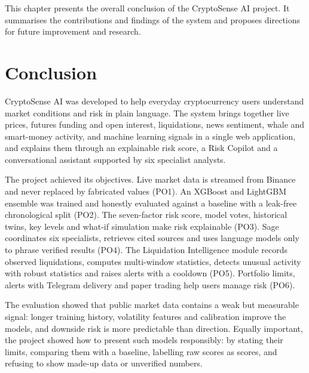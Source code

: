 
\chapteroverview
This chapter presents the overall conclusion of the CryptoSense AI project. It summarises the contributions and findings of the system and proposes directions for future improvement and research.

\section{Conclusion}
CryptoSense AI was developed to help everyday cryptocurrency users understand market conditions and risk in plain language. The system brings together live prices, futures funding and open interest, liquidations, news sentiment, whale and smart-money activity, and machine learning signals in a single web application, and explains them through an explainable risk score, a Risk Copilot and a conversational assistant supported by six specialist analysts.

The project achieved its objectives. Live market data is streamed from Binance and never replaced by fabricated values (PO1). An XGBoost and LightGBM ensemble was trained and honestly evaluated against a baseline with a leak-free chronological split (PO2). The seven-factor risk score, model votes, historical twins, key levels and what-if simulation make risk explainable (PO3). Sage coordinates six specialists, retrieves cited sources and uses language models only to phrase verified results (PO4). The Liquidation Intelligence module records observed liquidations, computes multi-window statistics, detects unusual activity with robust statistics and raises alerts with a cooldown (PO5). Portfolio limits, alerts with Telegram delivery and paper trading help users manage risk (PO6).

The evaluation showed that public market data contains a weak but measurable signal: longer training history, volatility features and calibration improve the models, and downside risk is more predictable than direction. Equally important, the project showed how to present such models responsibly: by stating their limits, comparing them with a baseline, labelling raw scores as scores, and refusing to show made-up data or unverified numbers.

